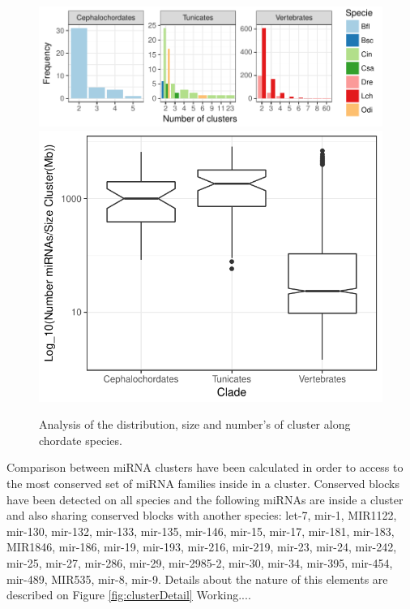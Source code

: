 \documentclass[11pt]{article}
\newcommand{\CAVH}[1]{\begingroup\color{red}#1\endgroup}
\begin{document}
\begin{figure}[ht]
\centering
\includegraphics[scale=1]{./cluster_number.pdf} \\ 
\includegraphics[scale=0.7]{./density.pdf} 
\caption{Analysis of the distribution, size and number's of cluster along chordate species.}
\label{fig:sizeCluster}
\end{figure}

Comparison between miRNA clusters have been calculated in order to access to the 
most conserved set of miRNA families inside in a cluster. Conserved blocks have 
been detected on all species and the following miRNAs are inside a 
cluster and also sharing conserved blocks with another species: let-7, mir-1, 
MIR1122, mir-130, mir-132, mir-133, mir-135, mir-146, mir-15, mir-17, mir-181, 
mir-183, MIR1846, mir-186, mir-19, mir-193, mir-216, mir-219, mir-23, mir-24, 
mir-242, mir-25, mir-27, mir-286, mir-29, mir-2985-2, mir-30, mir-34, mir-395, 
mir-454, mir-489, MIR535, mir-8, mir-9. Details about the nature of this 
elements are described on Figure \ref{fig:clusterDetail} \CAVH{Working...}.
\end{document}
